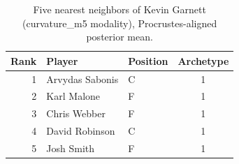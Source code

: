 \begin{table}[htbp]
  \centering\small
  \begin{tabular}{rllc}
    \toprule
    Rank & Player & Position & Archetype \\
    \midrule
    1 & Arvydas Sabonis & C & 1 \\
    2 & Karl Malone & F & 1 \\
    3 & Chris Webber & F & 1 \\
    4 & David Robinson & C & 1 \\
    5 & Josh Smith & F & 1 \\
    \bottomrule
  \end{tabular}
  \caption{Five nearest neighbors of Kevin Garnett (curvature_m5 modality), Procrustes-aligned posterior mean.}
  \label{tab:Kevin_Garnett_neighbors_curvature_m5}
\end{table}

